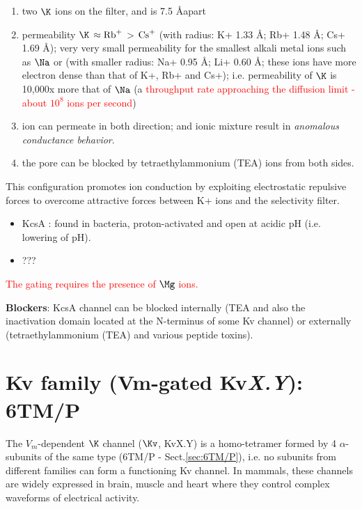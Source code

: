 \begin{enumerate}
  \item two $\K$ ions on the filter, and is 7.5 \AA apart
  
  \item permeability $\K$ $\approx \ce{Rb^+}$ > $\ce{Cs^+}$ (with radius: K+
  1.33 \AA; Rb+ 1.48 \AA; Cs+ 1.69 \AA); very very small permeability for the
  smallest alkali metal ions such as $\Na$ or  (with smaller radius:
  Na+ 0.95 \AA; Li+ 0.60 \AA; these ions have more electron dense than that of
  K+, Rb+ and Cs+); i.e.
  permeability of $\K$ is 10,000x more that of $\Na$ (a
  \textcolor{red}{throughput rate approaching the diffusion limit - about $10^8$
  ions per second})
  
  \item ion can permeate in both direction; and ionic mixture result in {\it
  anomalous conductance behavior}.
  
  \item the pore can be blocked by tetraethylammonium
(TEA) ions from both sides.
\end{enumerate}
This configuration promotes ion conduction by exploiting electrostatic
repulsive forces to overcome attractive forces between K+ ions and the
selectivity filter.



\begin{itemize}
  \item  KcsA : found in bacteria, proton-activated and open at acidic pH (i.e.
  lowering of pH).
  
  \item ???
\end{itemize}

\textcolor{red}{The gating requires the presence of $\Mg$ ions.} 

\label{sec:KcsA-channel-blockers}
{\bf Blockers}:   KcsA channel can be blocked internally (TEA and also the
inactivation domain located at the N-terminus of some Kv channel) or externally
(tetraethylammonium (TEA) and various peptide toxins).


\section{Kv family (Vm-gated Kv{\it X.Y}): 6TM/P}
\label{sec:Kchannel_Vm-dependent}

The $V_m$-dependent $\K$ channel ($\Kv$, KvX.Y) is a homo-tetramer formed by 4
$\alpha$-subunits of the same type (6TM/P - Sect.\ref{sec:6TM/P}), i.e. no
subunits from different families can form a functioning Kv channel.
In mammals, these channels are widely expressed in brain, muscle and heart where
they control complex waveforms of electrical activity.

